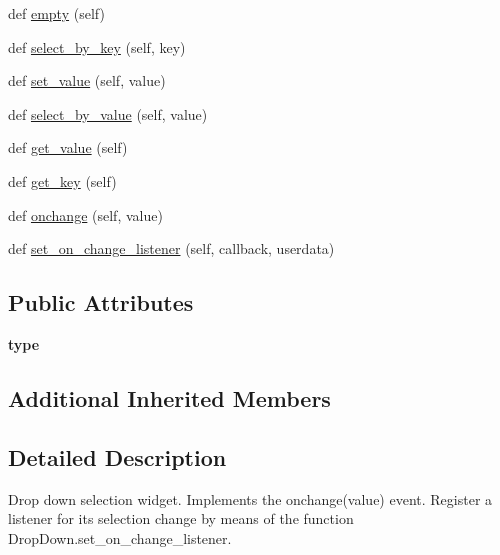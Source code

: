 \begin{DoxyCompactItemize}
def \hyperlink{classremi_1_1gui_1_1DropDown_a0d08df5632bb86d7e080a0a16dfed81b}{empty} (self)
\item 
def \hyperlink{classremi_1_1gui_1_1DropDown_ab90bddfa11c58ca1f3dc511e71c208a0}{select\+\_\+by\+\_\+key} (self, key)
\item 
def \hyperlink{classremi_1_1gui_1_1DropDown_a4ae2ce02966ee50469ac41ebdabf69d8}{set\+\_\+value} (self, value)
\item 
def \hyperlink{classremi_1_1gui_1_1DropDown_a0ace4729ed7dcbeb794dd74c4319966b}{select\+\_\+by\+\_\+value} (self, value)
\item 
def \hyperlink{classremi_1_1gui_1_1DropDown_a27a3a7621118ca5a52aeaacc1727863d}{get\+\_\+value} (self)
\item 
def \hyperlink{classremi_1_1gui_1_1DropDown_ac68a8e0482c7bf82e57ca9cfc943be01}{get\+\_\+key} (self)
\item 
def \hyperlink{classremi_1_1gui_1_1DropDown_afc8c3b60e36d41160ca6fe5fb56188c4}{onchange} (self, value)
\item 
def \hyperlink{classremi_1_1gui_1_1DropDown_ae89e13b02debba198e4c8d30852e42e6}{set\+\_\+on\+\_\+change\+\_\+listener} (self, callback, userdata)
\end{DoxyCompactItemize}
\subsection*{Public Attributes}
\begin{DoxyCompactItemize}
\item 
{\bfseries type}\hypertarget{classremi_1_1gui_1_1DropDown_a71e6df9091a9b4c748f6d9771d23d858}{}\label{classremi_1_1gui_1_1DropDown_a71e6df9091a9b4c748f6d9771d23d858}

\end{DoxyCompactItemize}
\subsection*{Additional Inherited Members}


\subsection{Detailed Description}
\begin{DoxyVerb}Drop down selection widget. Implements the onchange(value) event. Register a listener for its selection change
by means of the function DropDown.set_on_change_listener.
\end{DoxyVerb}
 

